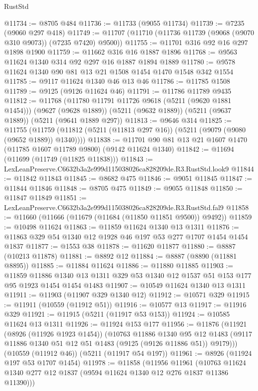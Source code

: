 \begin{lexlean}{RustStd}
\begin{coremodule}
@11734 := @8705 @484
@11736 := @11733 (@9055 @11734)
@11739 := @7235 (@9060 @297 @418)
@11749 := @11707 (@11710 (@11736 @11739 (@9068 (@9070 @310 @9073)) (@7235 @7420) @9500))
@11755 := @11701 @316 @92 @16 @297 @1898 @1900
@11759 := @11662 @316 @16 @1887 @1896
@11768 := @9563 @11624 @1340 @314 @92 @297 @16 @1887 @1894 @1889
@11780 := @9578 @11624 @1340 @90 @81 @13 @21 @1508 @1454 @1470 @1548 @342 @1554
@11785 := @9117 @11624 @1340 @46 @13 @46
@11786 := @11785 @1508
@11789 := @9125 (@9126 @11624 @46)
@11791 := @11786 @11789 @9435
@11812 := @11768
    (@11780 @11791 @11726 @9618 (@5211 (@9620 @1881 @1454)))
    (@9627 (@9628 @1889))
    (@5211 (@9632 @1889))
    (@5211 (@9637 @1889))
    (@5211 (@9641 @1889 @297))
@11813 := @9646 @314
@11825 := @11755
    (@11759 (@11812 (@5211 (@11813 @297 @16)) (@5211 (@9079 (@9080 (@9652 @1889)) @1340))))
@11838 := @11701 @90 @81 @13 @21 @1607 @1470 (@11785 @1607 @11789 @9800) (@9142 @11624 @1340)
@11842 := @11694 (@11699 (@11749 (@11825 @11838)))
@11843 := LexLeanPreserve.C6632b3a2e999d115038026ca828209de.R3.RustStd.look9
@11844 := @11842 @11843
@11845 := @8682 @475
@11846 := @9051 @11845
@11847 := @11844 @11846
@11848 := @8705 @475
@11849 := @9055 @11848
@11850 := @11847 @11849
@11851 := LexLeanPreserve.C6632b3a2e999d115038026ca828209de.R3.RustStd.fal9
@11858 := @11660 (@11666 (@11679 (@11684 (@11850 @11851 @9500)) @9492))
@11859 := @10498 @11624
@11863 := @11859 @11624 @1340 @13 @1311
@11876 := @11863 @329 @54 @1340 @12 @1928 @46 @197 @53 @277 @1707 @1454 @1454 @1837
@11877 := @1553 @38
@11878 := @11620 @11877
@11880 := @8887 (@10213 @11878)
@11881 := @8892 @12
@11884 := @8887 (@8890 (@11881 @8895))
@11885 := @11884 @11624
@11886 := @11880 @11885
@11903 := @11859
    @11886
    @1340
    @13
    @1311
    @329
    @53
    @1340
    @12
    @1537
    @51
    @153
    @177
    @95
    @1923
    @1454
    @1454
    @1483
@11907 := @10549 @11624 @1340 @13 @1311
@11911 := @11903 (@11907 @329 @1340 @12)
@11912 := @10571 @329
@11915 := @11911 (@10559 (@11912 @51))
@11916 := @10577 @13
@11917 := @11916 @329
@11921 := @11915 (@5211 (@11917 @53 @153))
@11924 := @10585 @11624 @13 @1311
@11926 := @11924 @153 @177
@11956 := @11876
    (@11921
      (@8926 (@11926 @1923 @1454))
      (@10763
        @11886
        @1340
        @95
        @12
        @1483
        (@9117 @11886 @1340 @51 @12 @51 @1483 (@9125 (@9126 @11886 @51)) @9179)))
    (@10559 (@11912 @46))
    (@5211 (@11917 @54 @197))
@11961 := @8926 (@11924 @197 @53 @1707 @1454)
@11978 := @11858
    (@11956
      @11961
      (@10763 @11624 @1340 @277 @12 @1837 (@9594 @11624 @1340 @12 @276 @1837 @11386 @11390)))

\end{coremodule}
\end{lexlean}
